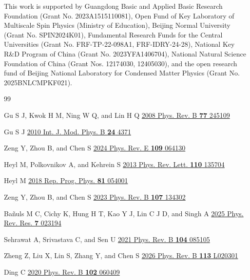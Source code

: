 \documentclass[aps,prb,floatfix,superscriptaddress,reprint]{revtex4-2}
\begin{document}
\begin{acknowledgments}
This work is supported by Guangdong Basic and Applied Basic Research Foundation (Grant No. 2023A1515110081), Open Fund of Key Laboratory of Multiscale Spin Physics (Ministry of Education), Beijing Normal University (Grant No. SPIN2024K01), Fundamental Research Funds for the Central Universities (Grant No. FRF-TP-22-098A1, FRF-IDRY-24-28), National Key R\&D Program of China (Grant No. 2023YFA1406704), National Natural Science Foundation of China (Grant Nos. 12174030, 12405030), and the open research fund of Beijing National Laboratory for Condensed Matter Physics (Grant No. 2025BNLCMPKF021).
\end{acknowledgments}

\begin{thebibliography}{99}

Gu S J, Kwok H M, Ning W Q, and Lin H Q \href{https://doi.org/10.1103/PhysRevB.77.245109}{2008 Phys. Rev. B \textbf{77} 245109}

Gu S J \href{https://doi.org/10.1142/S0217979210056335}{2010 Int. J. Mod. Phys. B \textbf{24} 4371}

Zeng Y, Zhou B, and Chen S \href{https://doi.org/10.1103/PhysRevE.109.064130}{2024 Phys. Rev. E \textbf{109} 064130}

Heyl M, Polkovnikov A, and Kehrein S \href{https://doi.org/10.1103/PhysRevLett.110.135704}{2013 Phys. Rev. Lett. \textbf{110} 135704}

Heyl M \href{https://doi.org/10.1088/1361-6633/aaaf9a}{2018 Rep. Prog. Phys. \textbf{81} 054001}

Zeng Y, Zhou B, and Chen S \href{https://doi.org/10.1103/PhysRevB.107.134302}{2023 Phys. Rev. B \textbf{107} 134302}

Ba\~{n}uls M C, Cichy K, Hung H T, Kao Y J, Lin C J D, and Singh A \href{https://doi.org/10.1103/PhysRevResearch.7.023194}{2025 Phys. Rev. Res. \textbf{7} 023194}

Sehrawat A, Srivastava C, and Sen U \href{https://doi.org/10.1103/PhysRevB.104.085105}{2021 Phys. Rev. B \textbf{104} 085105}

Zheng Z, Liu X, Lin S, Zhang Y, and Chen S \href{https://doi.org/10.1103/qc3w-s38g}{2026 Phys. Rev. B \textbf{113} L020301}

Ding C \href{https://doi.org/10.1103/PhysRevB.102.060409}{2020 Phys. Rev. B \textbf{102} 060409}


\end{thebibliography}
\end{document}
